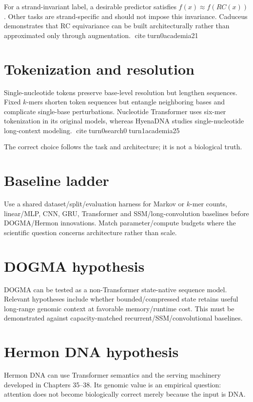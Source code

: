 For a strand-invariant label, a desirable predictor satisfies $f(x)\approx f(RC(x))$. Other tasks are strand-specific and should not impose this invariance. Caduceus demonstrates that RC equivariance can be built architecturally rather than approximated only through augmentation. citeturn0academia21

\section{Tokenization and resolution}
Single-nucleotide tokens preserve base-level resolution but lengthen sequences. Fixed $k$-mers shorten token sequences but entangle neighboring bases and complicate single-base perturbations. Nucleotide Transformer uses six-mer tokenization in its original models, whereas HyenaDNA studies single-nucleotide long-context modeling. citeturn0search0turn1academia25

The correct choice follows the task and architecture; it is not a biological truth.

\section{Baseline ladder}
Use a shared dataset/split/evaluation harness for Markov or $k$-mer counts, linear/MLP, CNN, GRU, Transformer and SSM/long-convolution baselines before DOGMA/Hermon innovations. Match parameter/compute budgets where the scientific question concerns architecture rather than scale.

\section{DOGMA hypothesis}
DOGMA can be tested as a non-Transformer state-native sequence model. Relevant hypotheses include whether bounded/compressed state retains useful long-range genomic context at favorable memory/runtime cost. This must be demonstrated against capacity-matched recurrent/SSM/convolutional baselines.

\section{Hermon DNA hypothesis}
Hermon DNA can use Transformer semantics and the serving machinery developed in Chapters 35--38. Its genomic value is an empirical question: attention does not become biologically correct merely because the input is DNA.

